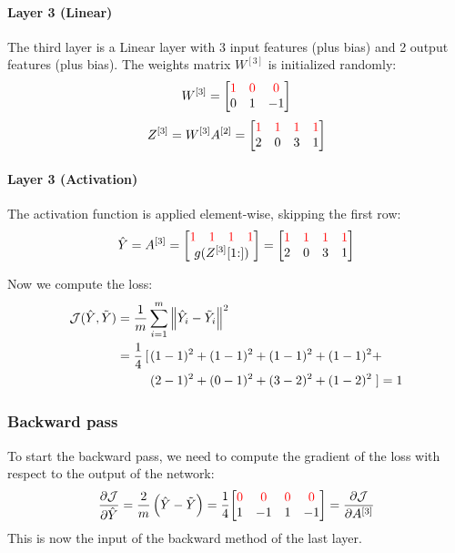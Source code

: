 \paragraph{Layer 3 (Linear)} The third layer is a Linear layer with 3 input features (plus bias) and 2 output features (plus bias). The weights matrix $W^{[3]}$ is initialized randomly:
\begin{equation*}
    W^{[3]} = \mqty[
        \color{red} 1 & \color{red} 0 & \color{red} 0 \\
        0 & 1 & -1
    ]
\end{equation*}
\begin{equation*}
    Z^{[3]} = W^{[3]} A^{[2]} = \mqty[
        \color{red} 1 & \color{red} 1 & \color{red} 1 & \color{red} 1 \\
        2 & 0 & 3 & 1
    ]
\end{equation*}

\paragraph{Layer 3 (Activation)} The activation function is applied element-wise, skipping the first row:
\begin{equation*}
    \hat{Y} = A^{[3]} = \mqty[
        \mqty{\color{red} 1 & \color{red} 1 & \color{red} 1 & \color{red} 1} \\
        g(Z^{[3]}[1\hspace{-0.6ex}:])
    ] = \mqty[
        \color{red} 1 & \color{red} 1 & \color{red} 1 & \color{red} 1 \\
        2 & 0 & 3 & 1
    ]
\end{equation*}

Now we compute the loss:
\begin{align*}
    \mathcal{J}(\hat{Y}, \tilde{Y}) &= \frac{1}{m} \sum_{i=1}^{m} \norm{\hat{Y}_i - \tilde{Y}_i}^2\\
    &\;\begin{aligned}
        = \frac{1}{4} \left[\right.&(1 - 1)^2 + (1 - 1)^2 + (1 - 1)^2 + (1 - 1)^2 + \\
        &(2 - 1)^2 + (0 - 1)^2 + (3 - 2)^2 + (1 - 2)^2\left.\right] = 1
    \end{aligned}
\end{align*}

\subsubsection{Backward pass}
To start the backward pass, we need to compute the gradient of the loss with respect to the output of the network:
\begin{equation*}
    \frac{\partial \J}{\partial \hat{Y}} = \frac{2}{m} \left(\hat{Y} - \tilde{Y}\right) = \frac{1}{4} \mqty[
        \color{red} 0 & \color{red} 0 & \color{red} 0 & \color{red} 0 \\
        1 & -1 & 1 & -1
    ] = \pdv{\J}{A^{[3]}}
\end{equation*}
This is now the input of the backward method of the last layer.

